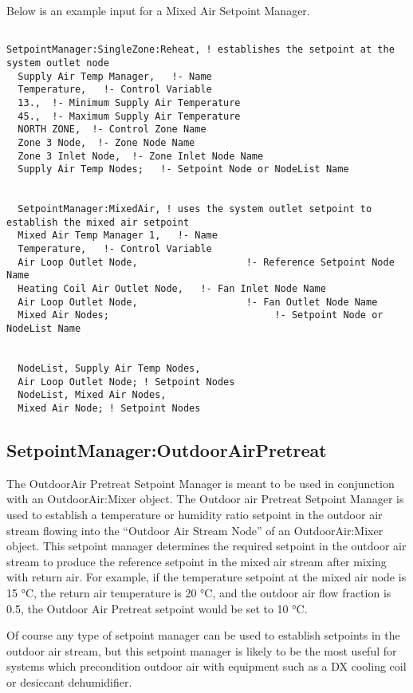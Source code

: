 Below is an example input for a Mixed Air Setpoint Manager.

\begin{lstlisting}

SetpointManager:SingleZone:Reheat, ! establishes the setpoint at the system outlet node
  Supply Air Temp Manager,   !- Name
  Temperature,   !- Control Variable
  13.,  !- Minimum Supply Air Temperature
  45.,  !- Maximum Supply Air Temperature
  NORTH ZONE,  !- Control Zone Name
  Zone 3 Node,  !- Zone Node Name
  Zone 3 Inlet Node,  !- Zone Inlet Node Name
  Supply Air Temp Nodes;   !- Setpoint Node or NodeList Name


  SetpointManager:MixedAir, ! uses the system outlet setpoint to establish the mixed air setpoint
  Mixed Air Temp Manager 1,   !- Name
  Temperature,   !- Control Variable
  Air Loop Outlet Node,                   !- Reference Setpoint Node Name
  Heating Coil Air Outlet Node,   !- Fan Inlet Node Name
  Air Loop Outlet Node,                   !- Fan Outlet Node Name
  Mixed Air Nodes;                             !- Setpoint Node or NodeList Name


  NodeList, Supply Air Temp Nodes,
  Air Loop Outlet Node; ! Setpoint Nodes
  NodeList, Mixed Air Nodes,
  Mixed Air Node; ! Setpoint Nodes
\end{lstlisting}

\subsection{SetpointManager:OutdoorAirPretreat}\label{setpointmanageroutdoorairpretreat}

The OutdoorAir Pretreat Setpoint Manager is meant to be used in conjunction with an OutdoorAir:Mixer object. The Outdoor air Pretreat Setpoint Manager is used to establish a temperature or humidity ratio setpoint in the outdoor air stream flowing into the ``Outdoor Air Stream Node'' of an OutdoorAir:Mixer object. This setpoint manager determines the required setpoint in the outdoor air stream to produce the reference setpoint in the mixed air stream after mixing with return air. For example, if the temperature setpoint at the mixed air node is 15 °C, the return air temperature is 20 °C, and the outdoor air flow fraction is 0.5, the Outdoor Air Pretreat setpoint would be set to 10 °C.

Of course any type of setpoint manager can be used to establish setpoints in the outdoor air stream, but this setpoint manager is likely to be the most useful for systems which precondition outdoor air with equipment such as a DX cooling coil or desiccant dehumidifier.

